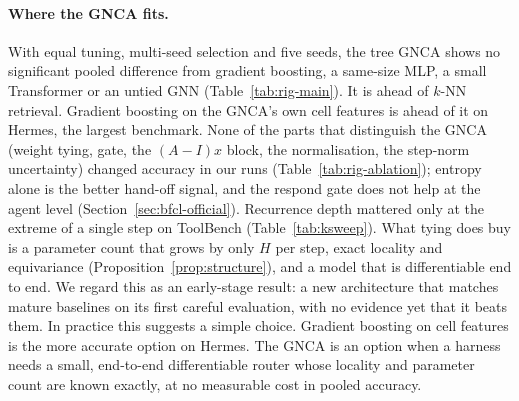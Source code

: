 \documentclass[10pt]{article}
\begin{document}
\paragraph{Where the GNCA fits.} With equal tuning, multi-seed selection and five seeds, the tree GNCA shows no significant pooled difference from gradient boosting, a same-size MLP, a small Transformer or an untied GNN (Table~\ref{tab:rig-main}). It is ahead of $k$-NN retrieval. Gradient boosting on the GNCA's own cell features is ahead of it on Hermes, the largest benchmark. None of the parts that distinguish the GNCA (weight tying, gate, the $(A{-}I)x$ block, the normalisation, the step-norm uncertainty) changed accuracy in our runs (Table~\ref{tab:rig-ablation}); entropy alone is the better hand-off signal, and the respond gate does not help at the agent level (Section~\ref{sec:bfcl-official}). Recurrence depth mattered only at the extreme of a single step on ToolBench (Table~\ref{tab:ksweep}). What tying does buy is a parameter count that grows by only $H$ per step, exact locality and equivariance (Proposition~\ref{prop:structure}), and a model that is differentiable end to end. We regard this as an early-stage result: a new architecture that matches mature baselines on its first careful evaluation, with no evidence yet that it beats them. In practice this suggests a simple choice. Gradient boosting on cell features is the more accurate option on Hermes. The GNCA is an option when a harness needs a small, end-to-end differentiable router whose locality and parameter count are known exactly, at no measurable cost in pooled accuracy.
\end{document}

